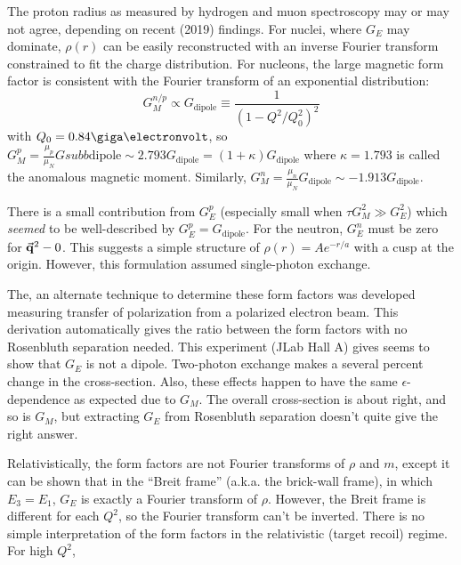 \documentclass[a4paper,twoside,master.tex]{subfiles}
\begin{document}

The proton radius as measured by hydrogen and muon spectroscopy may or may not agree, depending on recent (2019) findings. For nuclei, where $ G_E $ may dominate, $ \rho(r) $ can be easily reconstructed with an inverse Fourier transform constrained to fit the charge distribution. For nucleons, the large magnetic form factor is consistent with the Fourier transform of an exponential distribution:
\begin{equation}
    G_M^{n/p} \propto G_{\text{dipole}} \equiv \frac{1}{(1 - Q^2 / Q_0^2)^2}
\end{equation}
with $ Q_0 = 0.84\giga\electronvolt $, so $ G_M^p = \frac{\mu_p}{\mu_N} G subb \text{dipole} \sim 2.793 G_{\text{dipole}} = (1 + \kappa)G_{\text{dipole}} $ where $ \kappa = 1.793 $ is called the anomalous magnetic moment. Similarly, $ G_M^n = \frac{\mu_n}{\mu_N} G_{\text{dipole}} \sim -1.913 G_{\text{dipole}} $.

There is a small contribution from $ G_E^p $ (especially small when $ \tau G_M^2 \gg G_E^2 $) which \textit{seemed} to be well-described by $ G_E^p = G_{\text{dipole}} $. For the neutron, $ G_E^n $ must be zero for $ \va{q}^2 - 0 $. This suggests a simple structure of $ \rho(r) = A e^{-r/a} $ with a cusp at the origin. However, this formulation assumed single-photon exchange.

The, an alternate technique to determine these form factors was developed measuring transfer of polarization from a polarized electron beam. This derivation automatically gives the ratio between the form factors with no Rosenbluth separation needed. This experiment (JLab Hall A) gives seems to show that $ G_E $ is not a dipole. Two-photon exchange makes a several percent change in the cross-section. Also, these effects happen to have the same $ \epsilon $-dependence as expected due to $ G_M $. The overall cross-section is about right, and so is $ G_M $, but extracting $ G_E $ from Rosenbluth separation doesn't quite give the right answer.

Relativistically, the form factors are not Fourier transforms of $ \rho $ and $ m $, except it can be shown that in the ``Breit frame'' (a.k.a. the brick-wall frame), in which $ E_3 = E_1 $, $ G_E $ is exactly a Fourier transform of $ \rho $. However, the Breit frame is different for each $ Q^2 $, so the Fourier transform can't be inverted. There is no simple interpretation of the form factors in the relativistic (target recoil) regime. For high $ Q^2 $,
\end{document}
